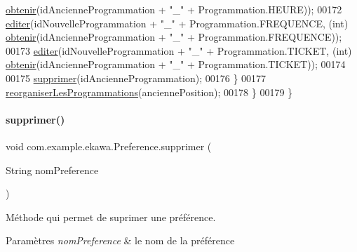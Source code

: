 \begin{DoxyCode}
      \hyperlink{classcom_1_1example_1_1ekawa_1_1_preference_a485d7fe31708aa1b85c0e2dcdcc05c0d}{obtenir}(idAncienneProgrammation + \textcolor{stringliteral}{"\_"} + Programmation.HEURE));
00172                 \hyperlink{classcom_1_1example_1_1ekawa_1_1_preference_a5af7a0595acfd41f1bd0b34ca0bfcb2a}{editer}(idNouvelleProgrammation + \textcolor{stringliteral}{"\_"} + Programmation.FREQUENCE, (\textcolor{keywordtype}{int}) 
      \hyperlink{classcom_1_1example_1_1ekawa_1_1_preference_a485d7fe31708aa1b85c0e2dcdcc05c0d}{obtenir}(idAncienneProgrammation + \textcolor{stringliteral}{"\_"} + Programmation.FREQUENCE));
00173                 \hyperlink{classcom_1_1example_1_1ekawa_1_1_preference_a5af7a0595acfd41f1bd0b34ca0bfcb2a}{editer}(idNouvelleProgrammation + \textcolor{stringliteral}{"\_"} + Programmation.TICKET, (\textcolor{keywordtype}{int}) 
      \hyperlink{classcom_1_1example_1_1ekawa_1_1_preference_a485d7fe31708aa1b85c0e2dcdcc05c0d}{obtenir}(idAncienneProgrammation + \textcolor{stringliteral}{"\_"} + Programmation.TICKET));
00174 
00175                 \hyperlink{classcom_1_1example_1_1ekawa_1_1_preference_a63914421a8e7b8f79822853e3aff3106}{supprimer}(idAncienneProgrammation);
00176             \}
00177             \hyperlink{classcom_1_1example_1_1ekawa_1_1_preference_a98ab818534d930d51fa09de962780fe3}{reorganiserLesProgrammations}(anciennePosition);
00178         \}
00179     \}
\end{DoxyCode}
\mbox{\label{classcom_1_1example_1_1ekawa_1_1_preference_a63914421a8e7b8f79822853e3aff3106}} 
\paragraph{\texorpdfstring{supprimer()}{supprimer()}}
{\footnotesize\ttfamily void com.\+example.\+ekawa.\+Preference.\+supprimer (\begin{DoxyParamCaption}\item[{String}]{nom\+Preference }\end{DoxyParamCaption})}



Méthode qui permet de suprimer une préférence. 


\begin{DoxyParams}{Paramètres}
{\em nom\+Preference} & le nom de la préférence \\
\hline
\end{DoxyParams}


